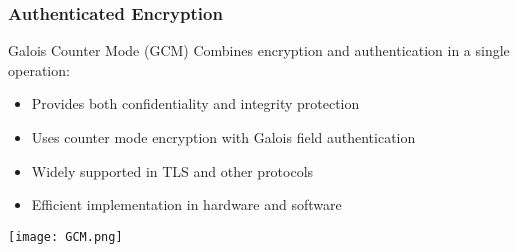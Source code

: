 \subsubsection{Authenticated Encryption}

\begin{concept}{Galois Counter Mode (GCM)}
    Combines encryption and authentication in a single operation:
    \begin{itemize}
        \item Provides both confidentiality and integrity protection
        \item Uses counter mode encryption with Galois field authentication
        \item Widely supported in TLS and other protocols
        \item Efficient implementation in hardware and software
    \end{itemize}
    \texttt{[image: GCM.png]}
\end{concept}


